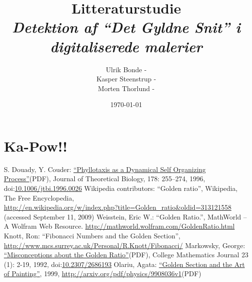 \documentclass[a4paper, 10pt, danish, final]{article}
\title{Litteraturstudie\\{\Large \emph{Detektion af ``Det Gyldne Snit'' i digitaliserede malerier}}}
\author{Ulrik Bonde - \mailto{bonde@diku.dk}\\
Kasper Steenstrup - \mailto{khsj@diku.dk}\\
Morten Thorlund - \mailto{thorlund@diku.dk}}
\date{\today}
\begin{document}
\maketitle
\thispagestyle{empty}

%

\section*{Ka-Pow!!}


\begin{thebibliography}{99}


 S. Douady, Y. Couder: \href{http://www.math.ntnu.no/~jarlet/Douady96.pdf}{``Phyllotaxis as a Dynamical Self Organizing Process''}(PDF), Journal of Theoretical Biology, 178: 255–274, 1996,  doi:\href{http://dx.doi.org/10.1006\%2Fjtbi.1996.0026}{10.1006/jtbi.1996.0026}
 Wikipedia contributors: ``Golden ratio'', Wikipedia, The Free Encyclopedia,\\
	\href{http://en.wikipedia.org/w/index.php?title=Golden\_ratio\&oldid=313121558}{http://en.wikipedia.org/w/index.php?title=Golden\_ratio\&oldid=313121558} (accessed September 11, 2009)
 Weisstein, Eric W.: ``Golden Ratio.'', MathWorld -- A Wolfram Web Resource. \href{http://mathworld.wolfram.com/GoldenRatio.html}{http://mathworld.wolfram.com/GoldenRatio.html}
 Knott, Ron: ``Fibonacci Numbers and the Golden Section'', \href{http://www.mcs.surrey.ac.uk/Personal/R.Knott/Fibonacci/}{http://www.mcs.surrey.ac.uk/Personal/R.Knott/Fibonacci/}
 Markowsky, George: \href{http://www.umcs.maine.edu/~markov/GoldenRatio.pdf}{``Misconceptions about the Golden Ratio''}(PDF), College Mathematics Journal 23 (1): 2-19, 1992, doi:\href{http://dx.doi.org/10.2307\%2F2686193}{10.2307/2686193}
 Olariu, Agata: \href{http://arxiv.org/abs/physics/9908036/}{``Golden Section and the Art of Painting''}, 1999, \href{http://arxiv.org/pdf/physics/9908036v1}{http://arxiv.org/pdf/physics/9908036v1}(PDF)


\end{thebibliography}


%
\end{document}
